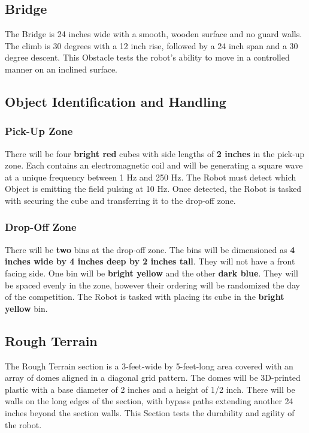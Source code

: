\subsection{Bridge}
The Bridge is 24 inches wide with a smooth, wooden surface and no guard walls. The climb is 30 degrees with a 12 inch rise, followed by a 24 inch span and a 30 degree descent. This Obstacle tests the robot’s ability to move in a controlled manner on an inclined surface.

\subsection{Object Identification and Handling}
	\subsubsection{Pick-Up Zone}
		There will be four \textbf{bright red} cubes with side lengths of \textbf{2 inches} in the pick-up zone. Each contains an electromagnetic coil and will be generating a square wave at a unique frequency between 1 Hz and 250 Hz. The Robot must detect which Object is emitting the field pulsing at 10 Hz. Once detected, the Robot is tasked with securing the cube and transferring it to the drop-off zone.
	\subsubsection{Drop-Off Zone}
		There will be \textbf{two} bins at the drop-off zone. The bins will be dimensioned as \textbf{4 inches wide by 4 inches deep by 2 inches tall}. They will not have a front facing side. One bin will be \textbf{bright yellow} and the other \textbf{dark blue}. They will be spaced evenly in the zone, however their ordering will be randomized the day of the competition. The Robot is tasked with placing its cube in the \textbf{bright yellow} bin.

\subsection{Rough Terrain}
The Rough Terrain section is a 3-feet-wide by 5-feet-long area covered with an array of domes aligned in a diagonal grid pattern. The domes will be 3D-printed plastic with a base diameter of 2 inches and a height of 1/2 inch. There will be walls on the long edges of the section, with bypass paths extending another 24 inches beyond the section walls. This Section tests the durability and agility of the robot.

